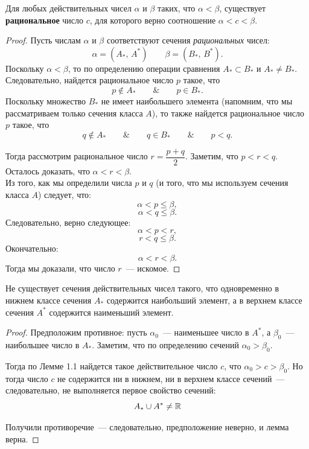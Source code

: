 \begin{lemma} \label{lemma_rational_in_real}
Для любых действительных чисел \(\alpha\) и \(\beta\) таких, что \(\alpha < \beta\), существует
\textbf{рациональное} число \(c\), для которого верно соотношение \(\alpha < c < \beta\).

\begin{proof}
Пусть числам \(\alpha\) и \(\beta\) соответствуют сечения \textit{рациональных} чисел:
\[
\alpha = (A_{*}, \, A^{*}) \qquad \beta = (B_{*}, \, B^{*}).
\]
Поскольку \(\alpha < \beta\), то по определению операции сравнения \(A_{*} \subset B_{*}\)
и \(A_{*} \neq B_{*}\). Следовательно, найдется рациональное число \(p\) такое, что
\[
p \notin A_{*} \qquad \& \qquad p \in B_{*}.
\]
Поскольку множество \(B_{*}\) не имеет наибольшего элемента (напомним, что
мы рассматриваем только сечения класса \(A\)), то также найдется рациональное число \(p\)
такое, что
\[
q \notin A_{*} \qquad \& \qquad q \in B_{*} \qquad \& \qquad p < q.
\]

Тогда рассмотрим рациональное число \(r = \dfrac{p+q}{2}\). Заметим, что \(p < r < q\).
Осталось доказать, что \(\alpha < r < \beta\). \\

Из того, как мы определили числа \(p\) и \(q\) (и того, что мы используем сечения класса \(A\))
следует, что:
\[
\alpha < p \leq \beta,
\]
\[
\alpha < q \leq \beta.
\]
Следовательно, верно следующее:
\[
\alpha < p < r,
\]
\[
r < q \leq \beta.
\]
Окончательно:
\[
\alpha < r < \beta.
\]
Тогда мы доказали, что число \(r\)~--- искомое.
\end{proof}
\end{lemma}

\begin{lemma}
Не существует сечения действительных чисел такого,
что одновременно в нижнем классе сечения \(A_{*}\) содержится наибольший элемент,
а в верхнем классе сечения \(A^{*}\) содержится наименьший элемент.

\vspace{2mm}

\begin{proof}
 Предположим противное: пусть \(\alpha_{0}\)~--- наименьшее число в \(A^{*}\), а
\(\beta_{0}\)~--- наибольшее число в \(A_{*}\). Заметим, что по определению сечений
\(\alpha_{0} > \beta_{0}\).

Тогда по Лемме 1.1 найдется такое действительное число \(c\), что
\(\alpha_{0} > c > \beta_{0}\). Но тогда число \(c\) не содержится ни в нижнем,
ни в верхнем классе сечений~--- следовательно, не выполняется первое свойство сечений:
\[
    A_{*}\cup A^{*} \neq \mathbb{R}
\]

Получили противоречие~--- следовательно, предположение неверно, и лемма верна.
\end{proof}
\end{lemma}

